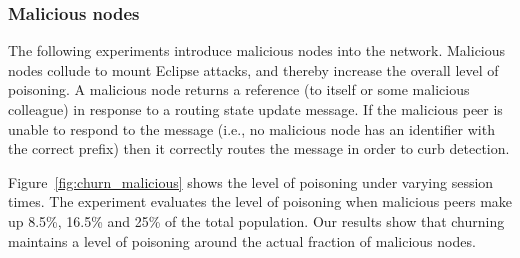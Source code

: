 \subsubsection{Malicious nodes}

The following experiments introduce malicious nodes into the network. Malicious
nodes collude to mount Eclipse attacks, and thereby increase the overall level of
poisoning. A malicious node returns a reference (to itself or some malicious
colleague) in response to a routing state update message. If the malicious peer is 
unable to respond to the message (i.e., no malicious node has an identifier with the 
correct prefix) then it correctly routes the message in order to curb detection.

Figure~\ref{fig:churn_malicious} shows the level of poisoning under varying
session times. The experiment evaluates the level of poisoning when malicious 
peers make up 8.5\%,  16.5\% and 25\% of the total population. Our results 
show that churning maintains a level of poisoning around the actual fraction 
of malicious nodes. 
